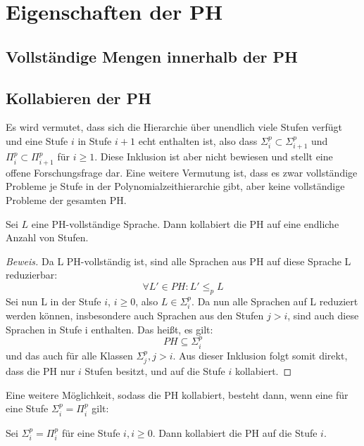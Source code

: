 \chapter{Eigenschaften der PH} \label{chapter: Eigenschaften der PH}
\section{Vollständige Mengen innerhalb der PH} \label{section: Vollständige Mengen innerhalb der PH}

\section{Kollabieren der PH} \label{section: Kollabieren der PH}
Es wird vermutet, dass sich die Hierarchie über unendlich viele Stufen verfügt und eine Stufe $i$ in Stufe $i + 1$ echt enthalten ist,
also dass $\Sigma^p_i \subset \Sigma^p_{i+1}$ und $\Pi^p_i \subset \Pi^p_{i+1}$ für $i \geq 1$. Diese Inklusion ist aber nicht bewiesen und stellt eine offene
Forschungsfrage dar. Eine weitere Vermutung ist, dass es zwar vollständige Probleme je Stufe in der Polynomialzeithierarchie gibt, aber keine vollständige Probleme der gesamten PH.
\begin{theorem}
    Sei $L$ eine PH-vollständige Sprache. Dann kollabiert die PH auf eine endliche Anzahl von Stufen. 
\end{theorem}

\begin{proof}[Beweis]
    Da L PH-vollständig ist, sind alle Sprachen aus PH auf diese Sprache L reduzierbar:
    $$
    \forall L' \in PH: L' \leq_p L
    $$
    Sei nun L in der Stufe $i$, $i \geq 0$, also $L \in \Sigma^p_i$. Da nun alle Sprachen auf L reduziert werden können, insbesondere
    auch Sprachen aus den Stufen $j > i$, sind auch diese Sprachen in Stufe i enthalten.
    Das heißt, es gilt: 
    $$
    PH \subseteq \Sigma^p_i
    $$ 
    und das auch für alle Klassen $\Sigma^p_j, j> i$.
    Aus dieser Inklusion folgt somit direkt, dass die PH nur $i$ Stufen besitzt, und auf die Stufe $i$ kollabiert.
\end{proof}

Eine weitere Möglichkeit, sodass die PH kollabiert, besteht dann, wenn eine für eine Stufe $\Sigma^p_i = \Pi^p_i$ gilt:

\begin{theorem}
    Sei $\Sigma^p_i = \Pi^p_i$ für eine Stufe $i, i \geq 0$. Dann kollabiert die PH auf die Stufe $i$.
\end{theorem}

